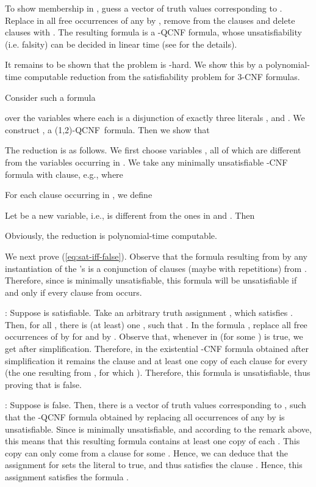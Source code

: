 \documentclass[aop,noinfoline]{imsart}
\renewcommand{\Box}{{\vrule width0.6ex height1em depth0cm}}
\newenvironment{proof}{\noindent{\bf Proof:}}{\hfill \Box}
\newcommand{\onetwo}{(1,2)}
\newcommand{\onetwoqcnf}{\mbox{\sf \onetwo-QCNF}}
\begin{document}
\begin{proof}
To show membership in , guess a vector of truth values  corresponding to . Replace in
 all free occurrences of any  by
, remove  from the clauses and delete clauses with
. The resulting formula is a -QCNF formula, whose
unsatisfiability (i.e. falsity) can be decided in linear time
(see \cite{AspvallPT-79} for the details).
\medskip



\noindent It remains to be shown that the problem is -hard.
We show this by a polynomial-time computable reduction from the
satisfiability problem for 3-CNF formulas.

Consider such a formula

over the variables   where each  is a
disjunction of exactly three literals ,  and
. We construct   ,   a
\onetwoqcnf\ formula.
Then we show that

The reduction is as follows. We first choose  variables , all of which are different from the variables  occurring in . We take any minimally
unsatisfiable -CNF formula with  clause, e.g.,
 where




For each clause 
occurring in , we define



Let  be a new variable, i.e.,  is different from the
ones in  and . Then

Obviously, the reduction is polynomial-time
computable.

\medskip

We next prove (\ref{eq:sat-iff-false}).  Observe that the formula
resulting from  by any instantiation of the 's
is a conjunction of  clauses (maybe with repetitions) from
. Therefore, since  is minimally unsatisfiable, this
formula will be unsatisfiable if and only if every clause from
 occurs.

\noindent : Suppose  is satisfiable. Take
an arbitrary truth assignment , which satisfies  .
Then, for all , there is (at least) one , such that . In the formula , replace all free occurrences of  by 
for  and  by . Observe that, whenever  in  (for some ) is true, we get  after  simplification. Therefore, in the existential -CNF
formula obtained after simplification it remains the clause
 and at least one copy of each clause  for every
 (the one resulting from , for which
). Therefore, this formula is unsatisfiable, thus
proving that  is false.




\noindent : Suppose  is false. Then,
there is a vector of truth values 
corresponding to , such that the -QCNF
formula obtained  by replacing all  occurrences of any  by
 is unsatisfiable. Since  is
minimally unsatisfiable, and according to the remark above, this
means that this resulting formula contains at least one copy of
each . This copy can only come from a clause 
for some . Hence, we can deduce that the
assignment  for   sets the literal
 to true, and thus satisfies the clause .
Hence, this assignment satisfies the formula .
\end{proof}
\end{document}
